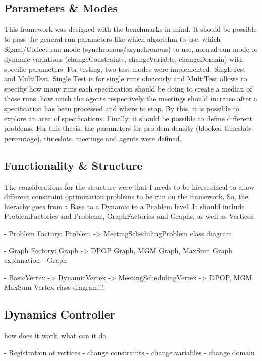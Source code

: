 \subsection{Parameters \& Modes}
This framework was designed with the benchmarks in mind.  It should be possible to pass the general run parameters like which algorithm to use, which Signal/Collect run mode (synchronous/asynchronous) to use, normal run mode or dynamic variations (changeConstraints, changeVariable, changeDomain) with specific parameters. For testing, two test modes were implemented: SingleTest and MultiTest. Single Test is for single runs obviously and MultiTest allows to specifiy how many runs each specification should be doing to create a median of those runs, how much the agents respectively the meetings should increase after a specification has been processed and where to stop. By this, it is possible to explore an area of specifications. Finally, it should be possible to define different problems. For this thesis, the parameters for problem density (blocked timeslots percentage), timeslots, meetings and agents were defined.

\subsection{Functionality \& Structure}

The considerations for the structure were that I needs to be hierarchical to allow different constraint optimization problems to be run on the framework. So, the hierachy goes from a Base to a Dynamic to a Problem level. It should include ProblemFactories and Problems, GraphFactories and Graphs, as well as Vertices.\newline\newline

- Problem Factory: Problem -> MeetingSchedulingProblem class diagram

- Graph Factory: Graph -> DPOP Graph, MGM Graph, MaxSum Graph explanation 
- Graph

- BasicVertex -> DynamicVertex -> MeetingSchedulingVertex -> DPOP, MGM, MaxSum Vertex class diagram!!!

\subsection{Dynamics Controller}

how does it work, what can it do

- Registration of vertices
- change constraints
- change variables
- change domain

